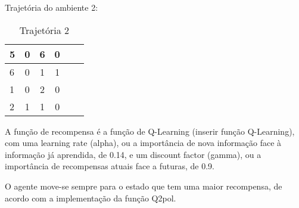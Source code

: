 \documentclass{scrartcl}
\begin{document}
Trajetória do ambiente 2:\par

	\begin{table}[h!]
	  \centering
	  \caption{Trajetória 2}
	  \label{tab:Trajetória 2}
	  \begin{tabular}{|l|c|c|c|c|r|}
	  	\hline
	    5 & 0 & 6 & 0\\
	    \hline
	    6 & 0 & 1 & 1\\
	    \hline
	    1 & 0 & 2 & 0\\
	    \hline
	    2 & 1 & 1 & 0\\
	    \hline
	  \end{tabular}
	\end{table}
	\par

A função de recompensa é a função de Q-Learning (inserir função Q-Learning), com uma learning rate (alpha), ou a importância de nova informação face
à informação já aprendida, de 0.14, e um discount factor (gamma), ou a importância de recompensas atuais face a futuras, de 0.9.\par

O agente move-se sempre para o estado que tem uma maior recompensa, de acordo com a implementação da função Q2pol.\par
\end{document}
